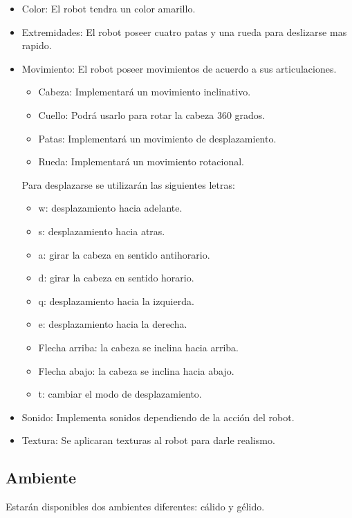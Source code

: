 \documentclass[a4paper]{article}
\begin{document}
\begin{itemize}
\item Color: El robot tendra un color amarillo.
\item Extremidades: El robot poseer cuatro patas y una rueda para deslizarse mas rapido.
\item Movimiento: El robot poseer movimientos de acuerdo a sus articulaciones.
	\begin{itemize}
		\item Cabeza: Implementará un movimiento inclinativo.
		\item Cuello: Podrá usarlo para rotar la cabeza 360 grados.
		\item Patas: Implementará un movimiento de desplazamiento.
		\item Rueda: Implementará un movimiento rotacional.
		
	\end{itemize}
	Para desplazarse se utilizarán las siguientes letras:
		\begin{itemize}
			\item w: desplazamiento hacia adelante.
			\item s: desplazamiento hacia atras.
			\item a: girar la cabeza en sentido antihorario.
			\item d: girar la cabeza en sentido horario.
			\item q: desplazamiento hacia la izquierda.
			\item e: desplazamiento hacia la derecha.
			\item Flecha arriba: la cabeza se inclina hacia arriba. 
			\item Flecha abajo: la cabeza se inclina hacia abajo.
			\item t: cambiar el modo de desplazamiento.
			
		\end{itemize}
\item Sonido: Implementa sonidos dependiendo de la acción del robot.
\item Textura: Se aplicaran texturas al robot para darle realismo.

\end{itemize}

\subsection{Ambiente}
Estarán disponibles dos ambientes diferentes: cálido y gélido.\\
\end{document}
